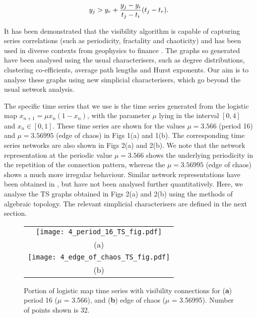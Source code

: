 \documentclass[aps,pre,superscriptaddress,groupedaddress,preprint]{revtex4}  %
\begin{document}
\begin{equation}
	y_j > y_r + \frac{y_j - y_i}{t_j - t_i} (t_j - t_r). \\
\end{equation}

It has been demonstrated that the visibility algorithm is capable of capturing series correlations (such as periodicity, fractality and chaoticity) and has been used in diverse contexts from geophysics \cite{geo} to finance \cite{finance}.
The graphs so generated have been analysed using the usual characterisers, such as degree distributions, clustering co-efficients, average path lengths and Hurst exponents. 
Our aim is to analyse these graphs using new simplicial characterisers, which go beyond the usual network analysis.


The specific time series that we use is the time series generated from the logistic map $x_{n+1} = \mu x_n (1 - x_n)$, with the parameter $\mu$ lying in the interval $[0,4]$ and $x_n \in [0,1]$. These time series are shown for the values 
$\mu=3.566 $ (period 16) and $\mu= 3.56995$ (edge of chaos)
in Figs 1(a) and 1(b). The corresponding time series networks are also shown in Figs 2(a) and 2(b). We note that the network representation at the periodic value $\mu= 3.566 $ shows the underlying periodicity in the repetition of the connection pattern, whereas the $\mu=3.56995$ (edge of chaos) shows a much more irregular behaviour. Similar network representations have been obtained in \cite{LL}, but have not been analysed further quantitatively.
Here, we analyse the TS graphs obtained in Figs 2(a) and 2(b) using the methods of algebraic topology. The relevant simplicial characterisers are defined in the next section.


\begin{figure*}[!h]
	\begin{center}
		\begin{tabular}{c}
			\texttt{[image: 4\_period\_16\_TS\_fig.pdf]}\\
			(a)\\
			\texttt{[image: 4\_edge\_of\_chaos\_TS\_fig.pdf]}\\
			(b)\\
		\end{tabular}{}
		\caption{Portion of logistic map time series with visibility connections for (\textbf{a}) period 16 ($\mu$ = 3.566), and (\textbf{b}) edge of chaos ($\mu$ = 3.56995). Number of points shown is 32.}
		\label{fig:TS}
	\end{center}
\end{figure*}
\end{document}

